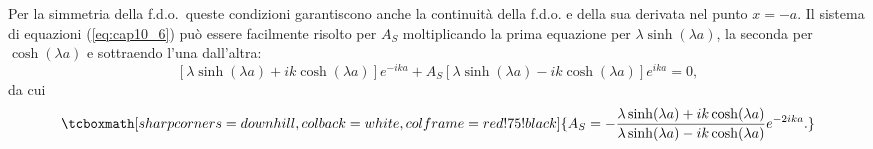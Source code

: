 \documentclass[a4paper,12pt,oneside]{book}
\begin{document}
Per la simmetria della f.d.o.~queste condizioni garantiscono anche la continuità della f.d.o. e della sua derivata nel punto $x=-a$. Il sistema di equazioni (\ref{eq:cap10_6}) può essere facilmente risolto per $A_S$ moltiplicando la prima equazione per $\lambda \sinh (\lambda a)$, la seconda per $\cosh (\lambda a)$ e sottraendo l'una dall'altra:
	\begin{equation}
		\left[\lambda \sinh (\lambda a)+ ik\cosh (\lambda a) \right]e^{-ika}+ A_S \left[\lambda \sinh (\lambda a)-ik \cosh (\lambda a) \right]e^{ika}=0,
	\end{equation}
da cui
	\begin{equation}
		\tcboxmath[sharp corners=downhill, colback=white, colframe=red!75!black]{	
			A_S=-\frac{\lambda \sinh (\lambda a)+ik \cosh (\lambda a)}{\lambda \sinh (\lambda a)-ik \cosh (\lambda a)}e^{-2ika}.
			}
	\label{eq:cap10_7}
	\end{equation}\\
	
\end{document}
